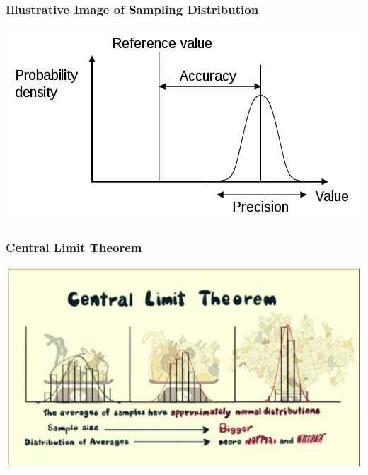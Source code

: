 \documentclass[handout]{beamer}
\begin{document}
\begin{frame}[fragile]
\frametitle{Illustrative Image of Sampling Distribution}

\begin{center}
\includegraphics[width=\textwidth]{figure/Accuracy_and_precision.png}
\end{center}

\end{frame}


\begin{frame}
\frametitle{Central Limit Theorem}
\begin{center}
\includegraphics[width=\textwidth]{figure/CLT.png}
\end{center}
\end{frame}
\end{document}
